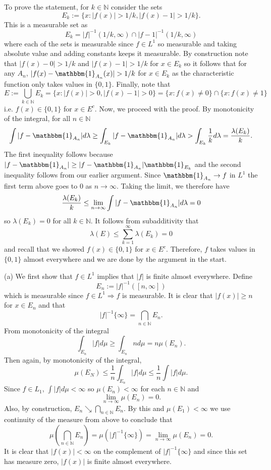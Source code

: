 \documentclass[12pt]{amsart} %
\def\N{\mathbb{N}}
\def\1{\mathbbm{1}}
\begin{document}
To prove the statement, for $k \in \N$ consider the sets $$E_k := \{x: |f(x)| > 1/k, |f(x)-1| > 1/k\}.$$ This is a measurable set as $$E_k = |f|^{-1} (1/k, \infty) \cap |f-1|^{-1} (1/k, \infty)$$ where each of the sets is measurable since $f \in L^1$ so measurable and taking absolute value and adding constants keeps it measurable. By construction note that $|f(x) - 0| >  1/k$ and $|f(x) - 1| > 1/k$ for $x \in E_k$ so it follows that for any $A_n$,  $|f(x) - \1_{A_n}(x)| > 1/k$ for $x \in E_k$ as the characteristic function only takes values in $\{0,1\} $. Finally, note that $$E:=\bigcup_{k \in \N} E_k = \{x: |f(x)| > 0, |f(x)-1| > 0\} = \{x: f(x) \neq 0 \} \cap \{x: f(x) \neq 1\}$$ i.e. $f(x) \in \{0,1\}$ for $x \in E^c$. Now, we proceed with the proof. By monotonicity of the integral, for all $n \in \N$ 
$$\int |f - \1_{A_n}|d\lambda \geq \int_{E_k} |f - \1_{A_n}|d\lambda > \int_{E_k} \frac{1}{k} d\lambda = \frac{\lambda(E_k)}{k}.$$ The first inequality follows because $|f-\1_{A_n}|\ge |f-\1_{A_n}|\1_{E_k}$ and the second inequality follows from our earlier argument. Since $\1_{A_n} \to f$ in $L^1$ the first term above goes to  $0$ as  $n \to  \infty$. Taking the limit, we therefore have 
$$\frac{\lambda(E_k)}{k} \le \lim_{n \to \infty} \int |f - \1_{A_n}|d\lambda = 0$$ so $\lambda(E_k) = 0$ for all $k \in \N$. It follows from subadditivity that $$\lambda(E) \le  \sum_{k=1}^{\infty} \lambda(E_k) = 0$$ and recall that we showed $f(x) \in \{0,1\}$ for $x \in E^c$. Therefore, $f$ takes values in  $\{0,1\}$ almost everywhere and we are done by the argument in the start.  

  
\newpage 
{}(a) We first show that $f \in L^1$ implies that $|f|$ is finite almost everywhere. Define $$E_n := |f|^{-1}\left( [n, \infty] \right) $$ which is measurable since $f \in L^1 \Rightarrow f$ is measurable. It is clear that $|f(x)| \ge  n$ for $x \in E_n$ and that $$|f|^{-1}\{\infty\} = \bigcap_{n \in \N} E_n.$$ From monotonicity of the integral $$\int_{E_n} |f| d\mu \ge  \int_{E_n} n d\mu  = n\mu(E_n).$$ Then again, by monotonicity of the integral, $$
\mu(E_N) \le  \frac{1}{n} \int_{E_n} |f| d\mu \le  \frac{1}{n} \int |f| d\mu.$$ Since $f \in L_1$, $\int |f| d\mu < \infty$ so $\mu(E_n) < \infty$ for each $n \in \N$ and $$
\lim_{n \to \infty} \mu(E_n) = 0.$$ Also, by construction, $E_n \searrow \bigcap_{n \in \N} E_n$. By this and $\mu(E_1) < \infty$ we use continuity of the measure from above to conclude that $$
\mu\left( \bigcap_{n \in \N} E_n \right) = \mu\left( |f|^{-1}\{\infty\} \right) = \lim_{n \to \infty} \mu(E_n) = 0.
$$ It is clear that $|f(x)| < \infty$ on the complement of $|f|^{-1}\{\infty\}$ and since this set has measure zero, $|f(x)|$ is finite almost everywhere.
\end{document}
